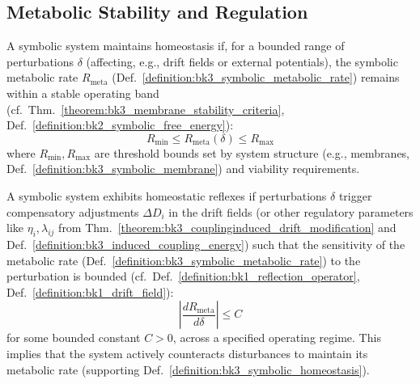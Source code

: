 \subsection{Metabolic Stability and Regulation}

\begin{definition} \label{definition:bk3_symbolic_homeostasis}
A symbolic system maintains homeostasis if, for a bounded range of perturbations $\delta$ (affecting, e.g., drift fields or external potentials), the symbolic metabolic rate $R_{\text{meta}}$ (Def.~\ref{definition:bk3_symbolic_metabolic_rate}) remains within a stable operating band (cf.~Thm.~\ref{theorem:bk3_membrane_stability_criteria}, Def.~\ref{definition:bk2_symbolic_free_energy}):
\[
R_{\text{min}} \leq R_{\text{meta}}(\delta) \leq R_{\text{max}}
\]
where $R_{\text{min}}, R_{\text{max}}$ are threshold bounds set by system
structure (e.g., membranes, Def.~\ref{definition:bk3_symbolic_membrane}) and
viability requirements.
\end{definition}

\begin{theorem} \label{theorem:bk3_homeostatic_reflexes}
A symbolic system exhibits homeostatic reflexes if perturbations $\delta$ trigger compensatory adjustments $\Delta D_i$ in the drift fields (or other regulatory parameters like $\eta_i, \lambda_{ij}$ from Thm.~\ref{theorem:bk3_couplinginduced_drift_modification} and Def.~\ref{definition:bk3_induced_coupling_energy}) such that the sensitivity of the metabolic rate (Def.~\ref{definition:bk3_symbolic_metabolic_rate}) to the perturbation is bounded (cf.~Def.~\ref{definition:bk1_reflection_operator}, Def.~\ref{definition:bk1_drift_field}):
\[
\left| \frac{d R_{\text{meta}}}{d \delta} \right| \leq C
\]
for some bounded constant $C > 0$, across a specified operating regime. This implies that the system actively counteracts disturbances to maintain its metabolic rate (supporting Def.~\ref{definition:bk3_symbolic_homeostasis}).
\end{theorem}

